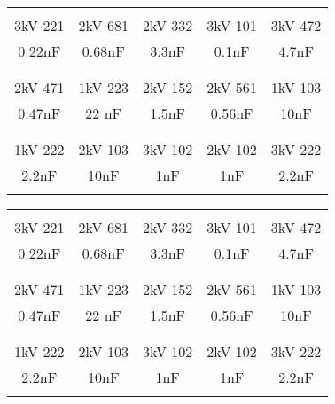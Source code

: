 \documentclass{article}
\begin{document}
\begin{center}
  \begin{tabular}{|c|c|c|c|c|}
    \hline
    &&&&\\
      3kV 221 & 2kV 681 & 2kV 332 & 3kV 101 & 3kV 472 \\
      0.22nF & 0.68nF & 3.3nF & 0.1nF & 4.7nF \\
    &&&&\\\hline
    &&&&\\
      2kV 471 & 1kV 223 & 2kV 152 & 2kV 561 & 1kV 103 \\
      0.47nF & 22 nF & 1.5nF & 0.56nF & 10nF \\
    &&&&\\\hline
    &&&&\\
      1kV 222 & 2kV 103 & 3kV 102 & 2kV 102 & 3kV 222 \\
      2.2nF & 10nF & 1nF & 1nF & 2.2nF \\
    &&&&\\\hline
  \end{tabular}
\end{center}

\begin{center}
  \begin{tabular}{|c|c|c|c|c|}
    \hline
    &&&&\\
      3kV 221 & 2kV 681 & 2kV 332 & 3kV 101 & 3kV 472 \\
      0.22nF & 0.68nF & 3.3nF & 0.1nF & 4.7nF \\
    &&&&\\\hline
    &&&&\\
      2kV 471 & 1kV 223 & 2kV 152 & 2kV 561 & 1kV 103 \\
      0.47nF & 22 nF & 1.5nF & 0.56nF & 10nF \\
    &&&&\\\hline
    &&&&\\
      1kV 222 & 2kV 103 & 3kV 102 & 2kV 102 & 3kV 222 \\
      2.2nF & 10nF & 1nF & 1nF & 2.2nF \\
    &&&&\\\hline
  \end{tabular}
\end{center}
\end{document}
